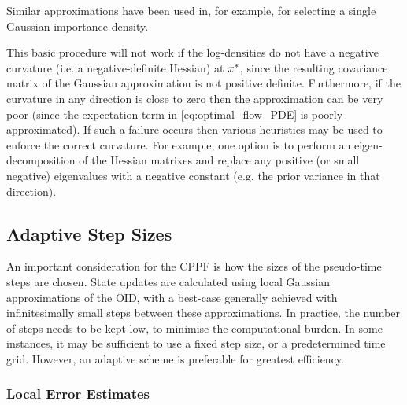 \documentclass{article}
\begin{document}
Similar approximations have been used in, for example, \citep{Doucet2000a,Pitt1999} for selecting a single Gaussian importance density.

This basic procedure will not work if the log-densities do not have a negative curvature (i.e. a negative-definite Hessian) at $x_{}^*$, since the resulting covariance matrix of the Gaussian approximation is not positive definite. Furthermore, if the curvature in any direction is close to zero then the approximation can be very poor (since the expectation term in \eqref{eq:optimal_flow_PDE} is poorly approximated). If such a failure occurs then various heuristics may be used to enforce the correct curvature. For example, one option is to perform an eigen-decomposition of the Hessian matrixes and replace any positive (or small negative) eigenvalues with a negative constant (e.g. the prior variance in that direction).
%







\subsection{Adaptive Step Sizes}

An important consideration for the CPPF is how the sizes of the pseudo-time steps are chosen. State updates are calculated using local Gaussian approximations of the OID, with a best-case generally achieved with infinitesimally small steps between these approximations. In practice, the number of steps needs to be kept low, to minimise the computational burden. In some instances, it may be sufficient to use a fixed step size, or a predetermined time grid. However, an adaptive scheme is preferable for greatest efficiency.

\subsubsection{Local Error Estimates}
\end{document}
